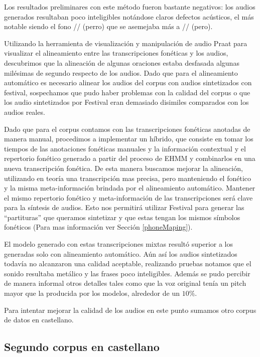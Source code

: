 Los resultados preliminares con este método fueron bastante negativos: los audios generados resultaban poco inteligibles notándose claros defectos acústicos, el más notable siendo el fono // (perro) que se asemejaba más a // (pero).

Utilizando la herramienta de visualización y manipulación de audio Praat \cite{praat} para visualizar el alineamiento entre las transcripciones fonéticas y los audios, descubrimos que la alineación de algunas oraciones estaba desfasada algunas milésimas de segundo respecto de los audios. Dado que para el alineamiento automático es necesario alinear los audios del corpus con audios sintetizados con festival, sospechamos que pudo haber problemas con la calidad del corpus o que los audio sintetizados por Festival eran demasiado disimiles comparados con los audios reales. 

Dado que para el corpus contamos con las transcripciones fonéticas anotadas de manera manual, procedimos a implementar un híbrido, que consiste en tomar los tiempos de las anotaciones fonéticas manuales y la información contextual y el repertorio fonético generado a partir del proceso de EHMM y combinarlos en una nueva transcripción fonética. De esta manera buscamos mejorar la alineación, utilizando en teoría una transcripción mas precisa, pero manteniendo el fonético y la misma meta-información brindada por el alineamiento automático. Mantener el mismo repertorio fonético y meta-información de las transcripciones será clave para la síntesis de audios. Esto nos permitirá utilizar Festival para generar las ``partituras'' que queramos sintetizar y que estas tengan los mismos símbolos fonéticos (Para mas información ver Sección \ref{phoneMaping}).

El modelo generado con estas transcripciones mixtas resultó superior a los generadas solo con alineamiento automático. Aún así los audios sintetizados todavía no alcanzaron una calidad aceptable, realizando pruebas notamos que el sonido resultaba metálico y las frases poco inteligibles. Además se pudo percibir de manera informal otros detalles tales como que la voz original tenía un pitch mayor que la producida por los modelos, alrededor de un $10\%$.

Para intentar mejorar la calidad de los audios en este punto sumamos otro corpus de datos en castellano.

\subsection{Segundo corpus en castellano}

